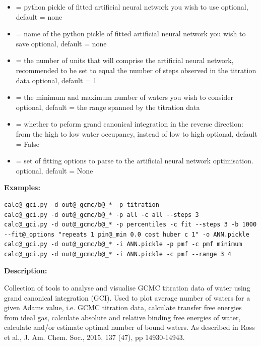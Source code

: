 \documentclass[letterpaper,10pt,english]{manual}
\begin{document}
\begin{itemize}
\item {} 
 = python pickle of fitted artificial neural network you wish to use
optional, default = none

\item {} 
 = name of the python pickle of fitted artificial neural network you wish to save
optional, default = none

\item {} 
 = the number of units that will comprise the artificial neural network, recommended to be set to equal the number of steps observed in the titration data
optional, default = 1

\item {} 
 = the minimum and maximum number of waters you wish to consider
optional, default = the range spanned by the titration data

\item {} 
 = whether to peform grand canonical integration in the reverse direction: from the high to low water occupancy, instead of low to high
optional, default = False

\item {} 
 = set of fitting options to parse to the artificial neural network optimisation.
optional, default = None

\end{itemize}

\textbf{Examples:}

\begin{Verbatim}[commandchars=@\[\]]
calc@_gci.py -d out@_gcmc/b@_* -p titration
calc@_gci.py -d out@_gcmc/b@_* -p all -c all --steps 3
calc@_gci.py -d out@_gcmc/b@_* -p percentiles -c fit --steps 3 -b 1000 --fit@_options "repeats 1 pin@_min 0.0 cost huber c 1" -o ANN.pickle
calc@_gci.py -d out@_gcmc/b@_* -i ANN.pickle -p pmf -c pmf minimum
calc@_gci.py -d out@_gcmc/b@_* -i ANN.pickle -c pmf --range 3 4
\end{Verbatim}

\textbf{Description:}

Collection of tools to analyse and visualise GCMC titration data of water using grand canonical integration (GCI). Used to plot average number of waters for a given Adams value, i.e. GCMC titration data, calculate transfer free energies from ideal gas, calculate absolute and relative binding free energies of water, calculate and/or estimate optimal number of bound waters. As described in Ross et al., J. Am. Chem. Soc., 2015, 137 (47), pp 14930-14943.
\end{document}

